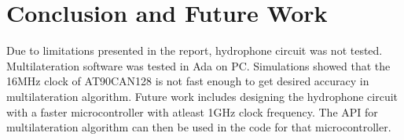 \section{Conclusion and Future Work}\label{sec:conclusion}
Due to limitations presented in the report, hydrophone circuit was not tested. Multilateration software was tested in Ada on PC. Simulations showed that the 16MHz clock of AT90CAN128 is not fast enough to get desired accuracy in multilateration algorithm. \newline
Future work includes designing the hydrophone circuit with a faster microcontroller with atleast 1GHz clock frequency. The API for multilateration algorithm can then be used in the code for that microcontroller.
